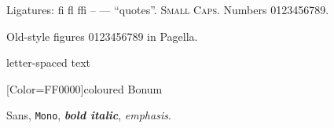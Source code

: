 \documentclass{article}
\begin{document}
Ligatures: fi fl ffi -- --- ``quotes''. \textsc{Small Caps}. Numbers 0123456789.

{\pagella Old-style figures 0123456789 in Pagella.}

{letter-spaced text}

{[Color=FF0000]coloured Bonum}

\textsf{Sans}, \texttt{Mono}, \textbf{\textit{bold italic}}, \emph{emphasis}.
\end{document}
